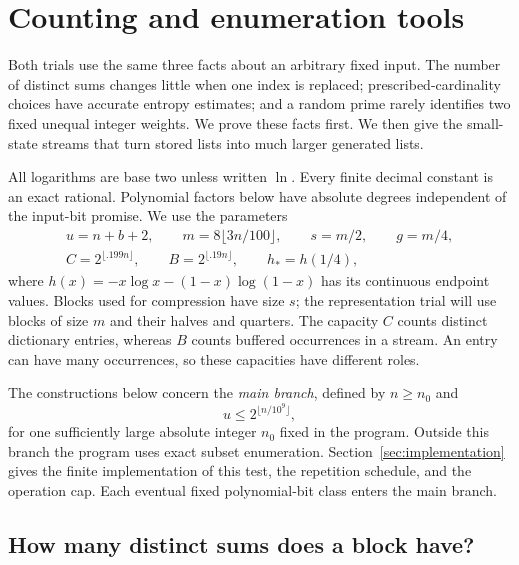 \section{Counting and enumeration tools}
\label{sec:preliminaries}

Both trials use the same three facts about an arbitrary fixed input.
The number of distinct sums changes little when one index is replaced;
prescribed-cardinality choices have accurate entropy estimates; and a
random prime rarely identifies two fixed unequal integer weights.
We prove these facts first. We then give the small-state streams that
turn stored lists into much larger generated lists.

All logarithms are base two unless written $\ln$. Every finite decimal
constant is an exact rational. Polynomial factors below have absolute
degrees independent of the input-bit promise. We use the parameters
\begin{equation}
\label{eq:parameters}
\begin{gathered}
 u=n+b+2,\qquad m=8\lfloor3n/100\rfloor,\qquad
 s=m/2,\qquad g=m/4,\\
 C=2^{\lfloor .199n\rfloor},\qquad
 B=2^{\lfloor .19n\rfloor},\qquad h_*=h(1/4),
\end{gathered}
\end{equation}
where $h(x)=-x\log x-(1-x)\log(1-x)$ has its continuous endpoint
values. Blocks used for compression have size $s$; the representation
trial will use blocks of size $m$ and their halves and quarters.
The capacity $C$ counts distinct dictionary entries, whereas $B$
counts buffered occurrences in a stream. An entry can have many
occurrences, so these capacities have different roles.

The constructions below concern the \emph{main branch}, defined by
$n\ge n_0$ and
\begin{equation}
\label{eq:guard}
 u\le 2^{\lfloor n/10^9\rfloor},
\end{equation}
for one sufficiently large absolute integer $n_0$ fixed in the
program. Outside this branch the program uses exact subset
enumeration. Section~\ref{sec:implementation} gives the finite
implementation of this test, the repetition schedule, and the operation
cap. Each eventual fixed polynomial-bit class enters the main branch.

\subsection{How many distinct sums does a block have?}


